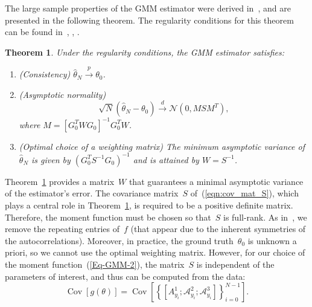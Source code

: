 \documentclass{article}
\newtheorem{theorem}[assumption]{Theorem}%
\newcommand{\A}[0]{\mathcal{A}}
\newcommand{\Cov}[0]{\operatorname{Cov}}
\begin{document}
The large sample properties of the GMM estimator were derived in~\cite{Hansen1982}, and are presented in the following theorem. The regularity conditions for this theorem can be found in~\cite{Hansen1982}, \cite{Hall2005}, \cite{abas2021generalized}.

\begin{theorem}\label{Thm-2-6}
	Under {the} regularity conditions, the GMM estimator satisfies:
	\begin{enumerate}[label={\Alph*}.]
		\item  \label{Thm-2-2}
		\textnormal{(Consistency)} $\hat{\theta}_N \overset{p}{\to} \theta_0$.

		\item \label{Thm-2-3} \textnormal{(Asymptotic normality)}
		\[\sqrt{N} ( \hat{\theta}_N - \theta_0) \overset{d}{\to} \mathcal{N}(0, M S M^T ),\] where $M =[G_0^T W  G_0]^{-1} G_0^T  W$.

		\item \label{Thm-2-5} \textnormal{(Optimal choice of a weighting matrix)} The minimum asymptotic variance of $\hat{\theta}_N$ is given by $(G_0^T S^{-1} G_0)^{-1}$ and is attained by $W = S^{-1}$.
	\end{enumerate}
\end{theorem}
Theorem~\ref{Thm-2-6} provides a matrix~$W$ {that} guarantees a minimal asymptotic variance of the estimator’s error. The covariance matrix~$S$ {of~(\ref{eqn:cov_mat_S}), which plays a central role in Theorem~\ref{Thm-2-6},} is required to be a positive definite matrix. Therefore, the moment function must be chosen so that~$S$ is full-rank. As in~\cite{abas2021generalized},  we remove the repeating entries of~$f$ (that appear due to the inherent symmetries of the autocorrelations). Moreover, in practice, the ground truth~$\theta_0$ is unknown a priori, so we cannot use the optimal weighting matrix. However, for our choice of the moment function~(\ref{Eq-GMM-2}), the matrix~$S$ is independent of the parameters of interest, and thus can be computed from the data:
	\begin{equation}\label{Eq-2-7}
		\Cov[g(\theta)] = \Cov\left[\left\{[A_{y_i}^1;\A_{y_i}^2;\A_{y_i}^3]\right\}_{i = 0}^{N - 1}\right].
	\end{equation}
\end{document}
